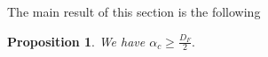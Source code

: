 \documentclass[12pt]{amsart}
\newtheorem{proposition}[theorem]{Proposition}
\theoremstyle{definition}
\theoremstyle{remark}
\newcommand{\E}{\mathbb{E}}
\newcommand{\MAB}{\mathscr{M}_{n}(W^{(2)})}
\numberwithin{equation}{section}
\begin{document}
The main result of this section is the following


\begin{proposition}\label{prop-sq-3case} 
We have
$
\alpha_c \ge \frac{ D_F}{2}.
$
\end{proposition}

 
\end{document}
